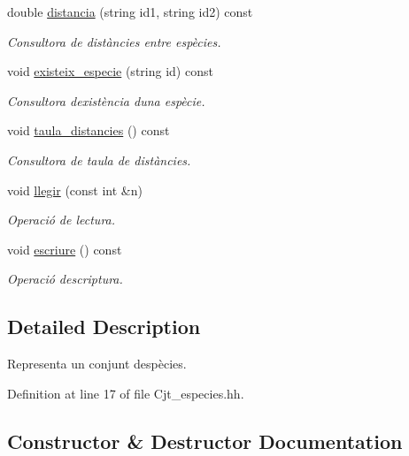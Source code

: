 \begin{DoxyCompactItemize}
double \hyperlink{class_cjt__especies_a9ae689689a019cfc1af02efb024ab5ce}{distancia} (string id1, string id2) const
\begin{DoxyCompactList}\small\item\em Consultora de distàncies entre espècies. \end{DoxyCompactList}\item 
void \hyperlink{class_cjt__especies_a57dca6b45a06f7eb233878bda1cf7226}{existeix\+\_\+especie} (string id) const
\begin{DoxyCompactList}\small\item\em Consultora d\textquotesingle{}existència d\textquotesingle{}una espècie. \end{DoxyCompactList}\item 
void \hyperlink{class_cjt__especies_ad66ac0438cce1ecf2c5553cb98f1085a}{taula\+\_\+distancies} () const
\begin{DoxyCompactList}\small\item\em Consultora de taula de distàncies. \end{DoxyCompactList}\item 
void \hyperlink{class_cjt__especies_a4d0f724a9540f96244f86913f916650c}{llegir} (const int \&n)
\begin{DoxyCompactList}\small\item\em Operació de lectura. \end{DoxyCompactList}\item 
void \hyperlink{class_cjt__especies_a07950c5f2b1c3e0384f246381ed7bd97}{escriure} () const
\begin{DoxyCompactList}\small\item\em Operació d\textquotesingle{}escriptura. \end{DoxyCompactList}\end{DoxyCompactItemize}


\subsection{Detailed Description}
Representa un conjunt d\textquotesingle{}espècies. 

Definition at line 17 of file Cjt\+\_\+especies.\+hh.



\subsection{Constructor \& Destructor Documentation}
\mbox{\label{class_cjt__especies_a0f07bec6607cc362c3d176476e8045b9}} 

